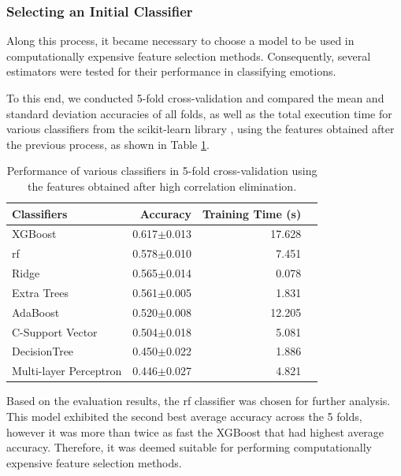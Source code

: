 \subsubsection{Selecting an Initial Classifier}

Along this process, it became necessary to choose a model to be used in computationally expensive feature selection methods. Consequently, several estimators were tested for their performance in classifying emotions.

To this end, we conducted 5-fold cross-validation and compared the mean and standard deviation accuracies of all folds, as well as the total execution time for various classifiers from the scikit-learn library \cite{pedregosa2011scikit}, using the features obtained after the previous process, as shown in Table \ref{tab:modelsPerformance}.

\begin{table}[H]
	\caption{Performance of various classifiers in 5-fold cross-validation using the features obtained after high correlation elimination.}
	\centering
	\label{tab:modelsPerformance}
	\begin{tabular}{lrrr}
		\toprule
		Classifiers &  Accuracy & Training Time (s) \\
		\midrule
		XGBoost                &        0.617$\pm$0.013  & 17.628 \\
		\ac{rf}                &        0.578$\pm$0.010  &  7.451 \\
		Ridge                  &        0.565$\pm$0.014  &  0.078 \\
		Extra Trees            &        0.561$\pm$0.005  &  1.831  \\
		AdaBoost               &        0.520$\pm$0.008  & 12.205  \\
		C-Support Vector       &        0.504$\pm$0.018  &  5.081 \\
		DecisionTree           &        0.450$\pm$0.022  &  1.886 \\
		Multi-layer Perceptron &        0.446$\pm$0.027  &  4.821 \\
		\bottomrule
	\end{tabular}
\end{table}

Based on the evaluation results, the \ac{rf} classifier was chosen for further analysis. This model exhibited the second best average accuracy across the 5 folds, however it was more than twice as fast the XGBoost that had highest average accuracy. Therefore, it was deemed suitable for performing computationally expensive feature selection methods.


